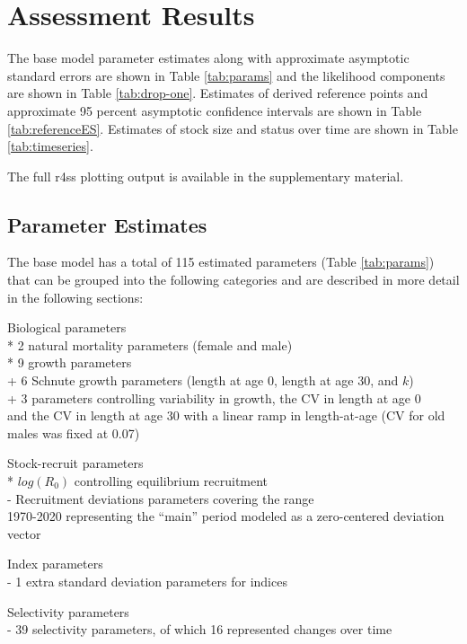 \documentclass[
  english,
  a4paper,
]{article}
\begin{document}
\hypertarget{assessment-results}{%
\section{Assessment Results}\label{assessment-results}}

The base model parameter estimates along with approximate asymptotic standard errors are shown in Table \ref{tab:params} and the likelihood components are shown in Table \ref{tab:drop-one}. Estimates of derived reference points and approximate 95 percent asymptotic confidence intervals are shown in Table \ref{tab:referenceES}. Estimates of stock size and status over time are shown in Table \ref{tab:timeseries}.

The full r4ss plotting output is available in the supplementary material.

\hypertarget{parameter-estimates}{%
\subsection{Parameter Estimates}\label{parameter-estimates}}

The base model has a total of 115 estimated parameters
(Table \ref{tab:params}) that can be grouped into the following
categories and are described in more detail in the following sections:

Biological parameters\\
* 2 natural mortality parameters (female and male)\\
* 9 growth parameters\\
+ 6 Schnute growth parameters (length at age 0, length at age 30, and \(k\))\\
+ 3 parameters controlling variability in growth, the CV in length at age 0\\
and the CV in length at age 30 with a linear ramp in length-at-age (CV for old males was fixed at 0.07)

Stock-recruit parameters\\
* \(log(R_0)\) controlling equilibrium recruitment\\
- Recruitment deviations parameters covering the range\\
1970-2020
representing the ``main'' period modeled as a zero-centered deviation vector

Index parameters\\
- 1 extra standard deviation parameters
for indices

Selectivity parameters\\
- 39 selectivity parameters, of which
16 represented changes over time
\end{document}
